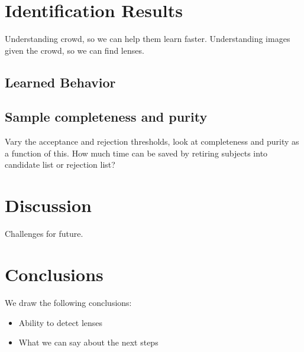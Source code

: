 \documentclass[useAMS,usenatbib,a4paper]{mn2e}
\begin{document}

\section{Identification Results}
\label{sec:IDresults}

Understanding crowd, so we can help them learn faster. Understanding
images given the crowd, so we can find lenses.


\subsection{Learned Behavior}
\label{sec:results:learning}


\subsection{Sample completeness and purity}
\label{sec:results:learning}

Vary the acceptance and rejection thresholds, look at completeness and
purity as a function of this. How much time can be saved by retiring
subjects into candidate list or rejection list?



\section{Discussion}
\label{sec:discuss}

Challenges for future.


\section{Conclusions}
\label{sec:conclude}

We draw the following conclusions:

\begin{itemize} 

\item Ability to detect lenses

\item What we can say about the next steps

\end{itemize}
\end{document}
